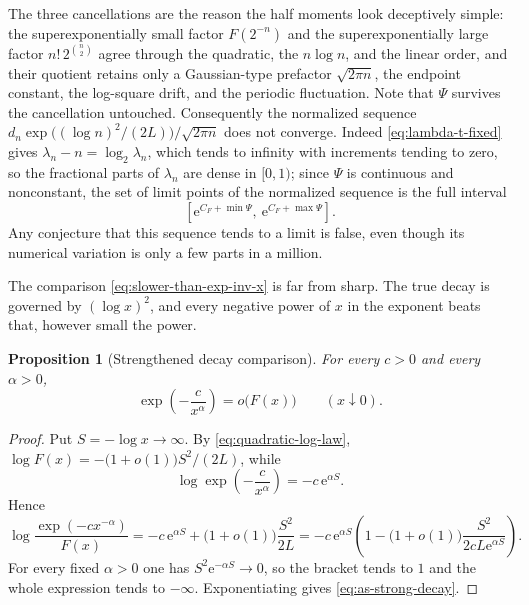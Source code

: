 \documentclass[11pt,oneside]{article}
\newtheorem{proposition}[theorem]{Proposition}
\theoremstyle{definition}
\theoremstyle{remark}
\newcommand{\e}{\mathrm e}
\newcommand{\smallo}{o}
\begin{document}
The three cancellations are the reason the half moments look deceptively simple: the
superexponentially small factor $F(2^{-n})$ and the superexponentially large factor
$n!\,2^{\binom n2}$ agree through the quadratic, the $n\log n$, and the linear order, and
their quotient retains only a Gaussian-type prefactor $\sqrt{2\pi n}$, the endpoint constant,
the log-square drift, and the periodic fluctuation.  Note that $\Psi$ survives the
cancellation untouched.  Consequently the normalized sequence
$d_n\exp\bigl((\log n)^{2}/(2L)\bigr)/\sqrt{2\pi n}$ does not converge.  Indeed
\eqref{eq:lambda-t-fixed} gives $\lambda_n-n=\log_2\lambda_n$, which tends to infinity with
increments tending to zero, so the fractional parts of $\lambda_n$ are dense in $[0,1)$; since
$\Psi$ is continuous and nonconstant, the set of limit points of the normalized sequence is the
full interval
\begin{equation*}
 \left[\e^{C_F+\min\Psi},\ \e^{C_F+\max\Psi}\right].
\end{equation*}
Any conjecture that this sequence tends to a limit is false, even though its numerical
variation is only a few parts in a million.

The comparison \eqref{eq:slower-than-exp-inv-x} is far from sharp.  The true decay is
governed by $(\log x)^{2}$, and every negative power of $x$ in the exponent beats that,
however small the power.

\begin{proposition}[Strengthened decay comparison]
\label{prop:as-decay}
For every $c>0$ and every $\alpha>0$,
\begin{equation}
 \exp\!\left(-\frac{c}{x^{\alpha}}\right)=\smallo\bigl(F(x)\bigr)
 \qquad(x\downarrow0).                                    \label{eq:as-strong-decay}
\end{equation}
\end{proposition}

\begin{proof}
Put $S=-\log x\to\infty$.  By \eqref{eq:quadratic-log-law},
$\log F(x)=-\bigl(1+\smallo(1)\bigr)S^{2}/(2L)$, while
\begin{equation*}
 \log\exp\!\left(-\frac{c}{x^{\alpha}}\right)=-c\,\e^{\alpha S}.
\end{equation*}
Hence
\begin{equation*}
 \log\frac{\exp(-cx^{-\alpha})}{F(x)}
 =-c\,\e^{\alpha S}+\bigl(1+\smallo(1)\bigr)\frac{S^{2}}{2L}
 =-c\,\e^{\alpha S}\left(1-\bigl(1+\smallo(1)\bigr)\frac{S^{2}}{2cL\e^{\alpha S}}\right).
\end{equation*}
For every fixed $\alpha>0$ one has $S^{2}\e^{-\alpha S}\to0$, so the bracket tends to $1$ and
the whole expression tends to $-\infty$.  Exponentiating gives
\eqref{eq:as-strong-decay}.
\end{proof}
\end{document}
